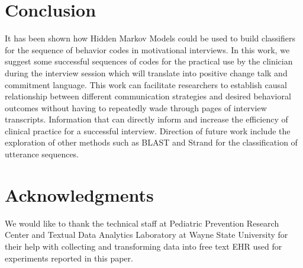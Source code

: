 \documentclass{amia}
\begin{document}
\section*{Conclusion}
It has been shown how Hidden Markov Models could be used to build classifiers for the sequence of behavior codes in motivational interviews. In this work, we suggest some successful sequences of codes for the practical use by the clinician during the interview session which will translate into positive change talk and commitment language. This work can facilitate researchers to establish causal relationship between different communication strategies and desired behavioral outcomes without having to repeatedly wade through pages of interview transcripts. Information that can directly inform and increase the efficiency of clinical practice for a successful interview. Direction of future work include the exploration of other methods such as BLAST \cite{altschul1990basic} and Strand \cite{drew2014strand} for the classification of utterance sequences. 


\section*{Acknowledgments}
We would like to thank the technical staff at Pediatric Prevention Research Center and Textual Data Analytics Laboratory at Wayne State University for their help with collecting and transforming data into free text EHR used for experiments reported in this paper. 



\end{document}
